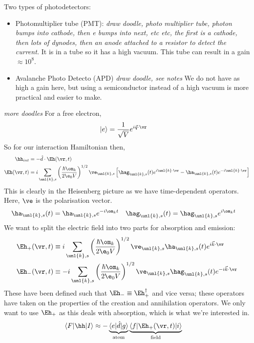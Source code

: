 \documentclass[a4paper, 11pt, normalem]{report}
\begin{document}
Two types of photodetectors:
\begin{itemize}
    \item Photomultiplier tube (PMT):
        \textit{draw doodle, photo multiplier tube, photon bumps into cathode, then e bumps into next, etc etc, the first is a cathode, then lots of dynodes, then an anode attached to a resistor to detect the current.}
        It is in a tube so it has a high vacuum. 
        This tube can result in a gain $\approx 10^8$.
    \item Avalanche Photo Detecto (APD)
        \textit{draw doodle, see notes}
        We do not have as high a gain here, but using a semiconductor instead of a high vacuum is more practical and easier to make.
\end{itemize}
\textit{more doodles}
For a free electron, 
\begin{align}
    |e\rangle &= \frac{1}{\sqrt{V}}e^{i\vec{q}\cdot\vr}
\end{align}
So for our interaction Hamiltonian then, 
\begin{align}
    \hh_{int} &= -\hat{d}\cdot\Eh(\vr,t) \\
    \Eh(\vr,t) &= i\sum_{\unl{k},s}\left(\frac{\hbar\om_k}{2\e_0V}\right)^{1/2}\ve_{\unl{k},s}\left[\hag_{\unl{k},s}(t)e^{i\unl{k}\cdot\vr} - \ha_{\unl{k},s}(t)e^{-i\unl{k}\cdot\vr}\right]
\end{align}
This is clearly in the Heisenberg picture as we have time-dependent operators. 
Here, $\ve$ is the polarisation vector.
\begin{align}
    \ha_{\unl{k},s}(t) &= \ha_{\unl{k},s}e^{-i\om_kt} & \hag_{\unl{k},s}(t) &= \hag_{\unl{k},s}e^{i\om_kt}
\end{align}
We want to split the electric field into two parts for absorption and emission:
\begin{align}
    \Eh_+(\vr,t) &\equiv i\sum_{\unl{k},s}\left(\frac{\hbar\om_k}{2\e_0V}\right)^{1/2}\ve_{\unl{k},s}\ha_{\unl{k},s}(t)e^{i\vec{k}\cdot\vr} \\
    \Eh_-(\vr,t) &\equiv -i\sum_{\unl{k},s}\left(\frac{\hbar\om_k}{2\e_0V}\right)^{1/2}\ve_{\unl{k},s}\hag_{\unl{k},s}(t)e^{-i\vec{k}\cdot\vr} \\
\end{align}
These have been defined such that $\Eh_- \equiv \Eh_+^\dagger$ and vice versa; these operators have taken on the properties of the creation and annihilation operators. 
We only want to use $\Eh_+$ as this deals with absorption, which is what we're interested in. 
\begin{align}
    \langle F|\hh|I\rangle &\approx -\underbrace{\langle e|\hat{d}|g\rangle}_{\text{atom}} \underbrace{\langle f|\Eh_+(\vr,t)|i\rangle}_{\text{field}} 
\end{align}
\end{document}
